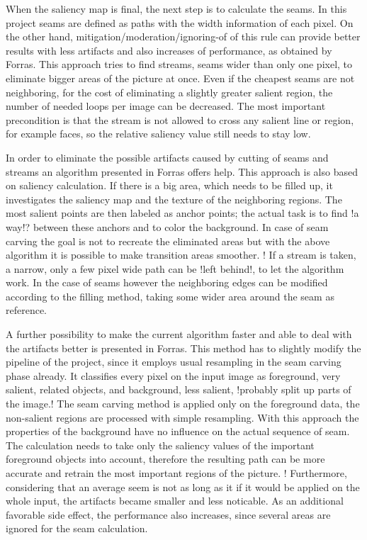 \documentclass[draft,final]{vutinfth} %
\begin{document}
	When the saliency map is final, the next step is to calculate the seams.
	In this project seams are defined as paths with the width information of each pixel.
	On the other hand,  mitigation/moderation/ignoring-of of this rule can provide better results with less artifacts and also increases of performance, as obtained by Forras.
	This approach tries to find streams, seams wider than only one pixel, to eliminate bigger areas of the picture at once.
	Even if the cheapest seams are not neighboring, for the cost of eliminating a slightly greater salient region, the number of needed loops per image can be decreased.
	The most important precondition is that the stream is not allowed to cross any salient line or region, for example faces, so the relative saliency value still needs to stay low. \par
	In order to eliminate the possible artifacts caused by cutting of seams and streams an algorithm presented in Forras offers help.
	This approach is also based on saliency calculation.
	If there is a big area, which needs to be filled up, it investigates the saliency map and the texture of the neighboring regions.
	The most salient points are then labeled as anchor points; the actual task is to find !a way!? between these anchors and to color the background.
	In case of seam carving the goal is not to recreate the eliminated areas but with the above algorithm it is possible to make transition areas smoother.
	! If a stream is taken, a narrow, only a few pixel wide path can be !left behind!, to let the algorithm work.
	In the case of seams however the neighboring edges can be modified according to the filling method, taking some wider area around the seam as reference.\par 
	A further possibility to make the current algorithm faster and able to deal with the artifacts better is presented in Forras.
	This method has to slightly modify the pipeline of the project, since it employs usual resampling in the seam carving phase already.
	It classifies every pixel on the input image as foreground, very salient, related objects, and background, less salient, !probably split up parts of the image.!
	The seam carving method is applied only on the foreground data, the non-salient regions are processed with simple resampling. 
	With this approach the properties of the background have no influence on the actual sequence of seam.
	The calculation needs to take only the saliency values of the important foreground objects into account, therefore the resulting path can be more accurate and retrain the most important regions of the picture.
	! Furthermore, considering that an average seem is not as long as it if it would be applied on the whole input, the artifacts became smaller and less noticable.
	As an additional favorable side effect, the performance also increases, since several areas are ignored for the seam calculation.    
	
\end{document}
